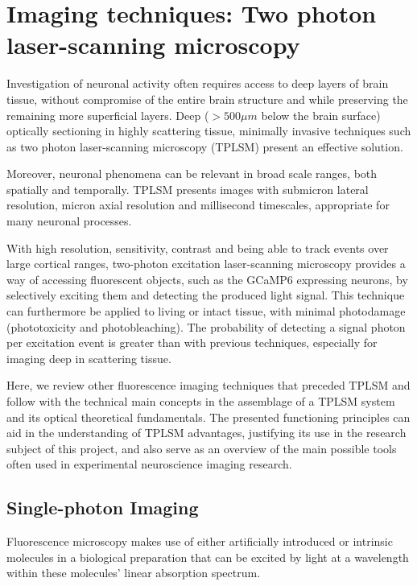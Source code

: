 \section{Imaging techniques: Two photon laser-scanning microscopy}
\label{sec:sectionc}

Investigation of neuronal activity often requires access to deep layers of brain tissue, without compromise of the entire brain structure and while preserving the remaining more superficial layers. Deep ($>500 \mu m$ below the brain surface) optically sectioning in highly scattering tissue, minimally invasive techniques such as two photon laser-scanning microscopy (TPLSM) present an effective solution. 

Moreover, neuronal phenomena can be relevant in broad scale ranges, both spatially and temporally. TPLSM presents images with submicron lateral resolution, micron axial resolution and millisecond timescales, appropriate for many neuronal processes.

With high resolution, sensitivity, contrast and being able to track events over large cortical ranges, two-photon excitation laser-scanning microscopy provides a way of accessing fluorescent objects, such as the GCaMP6 expressing neurons, by selectively exciting them and detecting the produced light signal. This technique can furthermore be applied to living or intact tissue, with minimal photodamage (phototoxicity and photobleaching). The probability of detecting a signal photon per excitation event is greater than with previous techniques, especially for imaging deep in scattering tissue.

Here, we review other fluorescence imaging techniques that preceded TPLSM and follow with the technical main concepts in the assemblage of a TPLSM system and its optical theoretical fundamentals. The presented functioning principles can aid in the understanding of TPLSM advantages, justifying its use in the research subject of this project, and also serve as an overview of the main possible tools often used in experimental neuroscience imaging research.


\subsection{Single-photon Imaging}

Fluorescence microscopy makes use of either artificially introduced or intrinsic molecules in a biological preparation that can be excited by light at a wavelength within these molecules' linear absorption spectrum.

